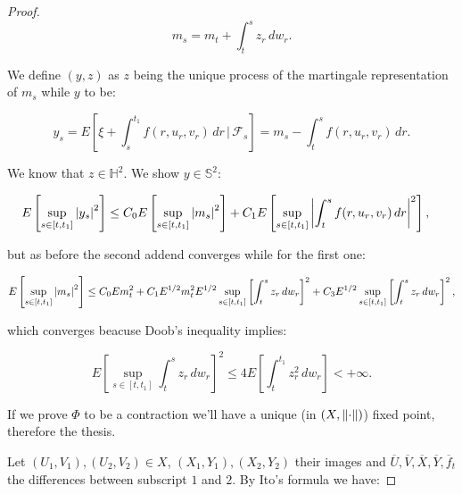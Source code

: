 \begin{theorem}
\begin{proof}
        \begin{equation}
            m_s = m_t + \int_t^{s} z_r\,dw_r.
        \end{equation}

        We define $(y,z)$ as $z$ being the unique process of the martingale representation of $m_s$ while $y$ to be:

        \begin{equation}
            y_s = E\left[\xi + \int_s^{t_1} f(r,u_r,v_r)\,dr\,|\,\mathcal{F}_s\right] = m_s - \int_t^s f(r,u_r,v_r)\,dr.
        \end{equation}

        We know that $z\in\mathbb{H}^2$. We show $y\in\mathbb{S}^2$:

        \begin{align}
            E\left[\sup_{s\in[t,t_1]}\abs{y_s}^2\right] & \leq C_0E\left[\sup_{s\in[t,t_1]}\abs{m_s}^2\right] + C_1E\left[\sup_{s\in[t,t_1]}\abs{\int_t^s f(r,u_r,v_r)\,dr}^2\right],
        \end{align}

        but as before the second addend converges while for the first one:

        \[E\left[\sup_{s\in[t,t_1]}\abs{m_s}^2\right] \leq C_0 Em_t^2 + C_1E^{1/2}m_t^2E^{1/2}\sup_{s\in[t,t_1]}\left[\int_t^{s}z_r\,dw_r\right]^2+C_3E^{1/2}\sup_{s\in[t,t_1]}\left[\int_t^{s}z_r\,dw_r\right]^2,\]

        which converges beacuse Doob's inequality implies:

        \[E\left[\sup_{s\in[t,t_1]}\int_t^sz_r\,dw_r\right]^2 \leq 4E\left[\int_t^{t_1}z_r^2\,dw_r\right]<+\infty.\]

        If we prove $\Phi$ to be a contraction we'll have a unique (in $(X,\norm{\cdot})$) fixed point, therefore the thesis. 
        
        Let $(U_1,V_1),(U_2,V_2)\in X$, $(X_1,Y_1),(X_2,Y_2)$ their images and $\overline{U},\overline{V},\overline{X},\overline{Y},\overline{f}_t$ the differences between subscript $1$ and $2$. 
        By Ito's formula we have:


\end{proof}
\end{theorem}
